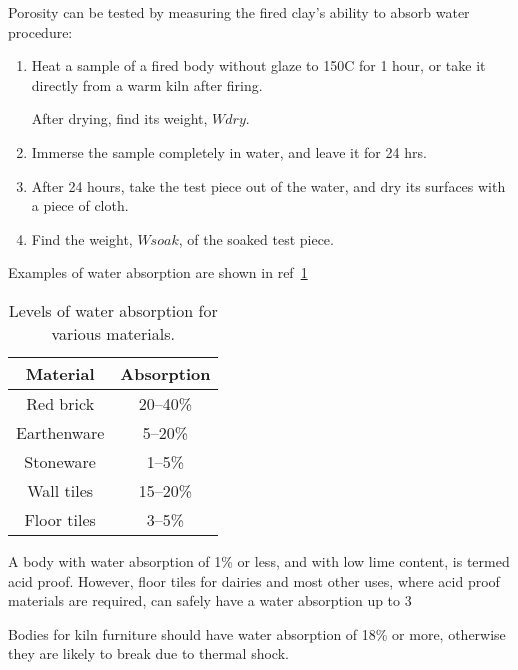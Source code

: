 Porosity can be tested by measuring the fired clay's ability to absorb water 
procedure:
\begin{enumerate}
\item Heat a sample of a fired body without glaze to 150\degree C for 1 hour, 
or take 
it directly from a warm kiln after firing.

After drying, find its weight, $Wdry$.

\item Immerse the sample completely in water, and leave it for 24 hrs.

\item After 24 hours, take the test piece out of the water, and dry its 
surfaces with a piece of cloth.

\item Find the weight, $Wsoak$, of the soaked test piece.
\end{enumerate}
Examples of water absorption are shown in ref~\ref{tab:waterabsorption}
\begin{center}
  \begin{table}\centering
    \renewcommand{\arraystretch}{1.5}    
    \begin{tabular}{|c|c|}\hline
      \textbf{Material}&\textbf{Absorption}\\\hline\hline
Red brick&20--40\%\\\hline
Earthenware&5--20\%\\\hline
Stoneware&1--5\%\\\hline
Wall tiles&15--20\%\\\hline
Floor tiles&3--5\%\\\hline
    \end{tabular}
    \caption{Levels of water absorption for various materials.}
    \label{tab:waterabsorption}
  \end{table}
\end{center}
A body with water absorption of 1\% or less, and with low lime content, is 
termed acid proof. However, floor tiles for dairies and most other uses, where 
acid proof materials are required, can safely have a water absorption up to 3%

Bodies for kiln furniture should have water absorption of 18\% or more, 
otherwise they are likely to break due to thermal shock.
